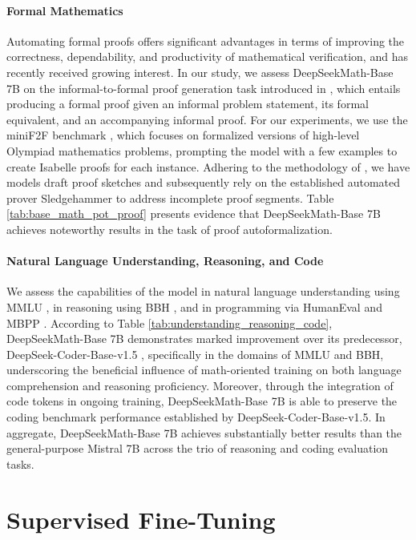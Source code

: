 \begin{itemize}[topsep=0pt]
\paragraph{Formal Mathematics}

Automating formal proofs offers significant advantages in terms of improving the correctness, dependability, and productivity of mathematical verification, and has recently received growing interest. In our study, we assess DeepSeekMath-Base 7B on the informal-to-formal proof generation task introduced in \citep{dsp_proof}, which entails producing a formal proof given an informal problem statement, its formal equivalent, and an accompanying informal proof. For our experiments, we use the miniF2F benchmark \citep{minif2f}, which focuses on formalized versions of high-level Olympiad mathematics problems, prompting the model with a few examples to create Isabelle proofs for each instance. Adhering to the methodology of \cite{dsp_proof}, we have models draft proof sketches and subsequently rely on the established automated prover Sledgehammer \citep{sledgehammer} to address incomplete proof segments. Table \ref{tab:base_math_pot_proof} presents evidence that DeepSeekMath-Base 7B achieves noteworthy results in the task of proof autoformalization.

\paragraph{Natural Language Understanding, Reasoning, and Code}

We assess the capabilities of the model in natural language understanding using MMLU \citep{mmlu}, in reasoning using BBH \citep{bbh}, and in programming via HumanEval \citep{codex} and MBPP \citep{mbpp}. According to Table \ref{tab:understanding_reasoning_code}, DeepSeekMath-Base 7B demonstrates marked improvement over its predecessor, DeepSeek-Coder-Base-v1.5 \citep{deepseek-coder}, specifically in the domains of MMLU and BBH, underscoring the beneficial influence of math-oriented training on both language comprehension and reasoning proficiency. Moreover, through the integration of code tokens in ongoing training, DeepSeekMath-Base 7B is able to preserve the coding benchmark performance established by DeepSeek-Coder-Base-v1.5. In aggregate, DeepSeekMath-Base 7B achieves substantially better results than the general-purpose Mistral 7B \citep{mistral} across the trio of reasoning and coding evaluation tasks.

\section{Supervised Fine-Tuning}


\end{itemize}
